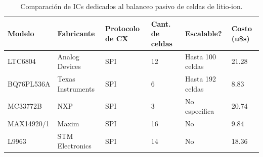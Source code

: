 \documentclass[10pt, a4paper]{report}
\begin{document}
\begin{table}[h!]
    \begin{center}
        \begin{tabular}{llllll}
        \hline
        Modelo     & Fabricante        & Protocolo de CX    & Cant. de celdas & Escalable?          & Costo (u\$s) \\ \hline
        LTC6804    & Analog Devices    & SPI                & 12              & Hasta 100 celdas    & 21.28        \\
        BQ76PL536A & Texas Instruments & SPI                & 6               & Hasta 192 celdas    & 8.83         \\
        MC33772B   & NXP               & SPI                & 3               & No especifica       & 20.74        \\
        MAX14920/1 & Maxim             & SPI                & 16              & No                  & 9.84         \\
        L9963      & STM Electronics   & SPI                & 14              & No                  & 18.36        \\        
        \hline
        \end{tabular}
    \end{center}
    \caption{Comparaci\'on de \acrshort{IC}s dedicados al balanceo pasivo de
    celdas de litio-ion.}
    \label{tbl:bq76_comparativa_ics}
\end{table}
\end{document}
